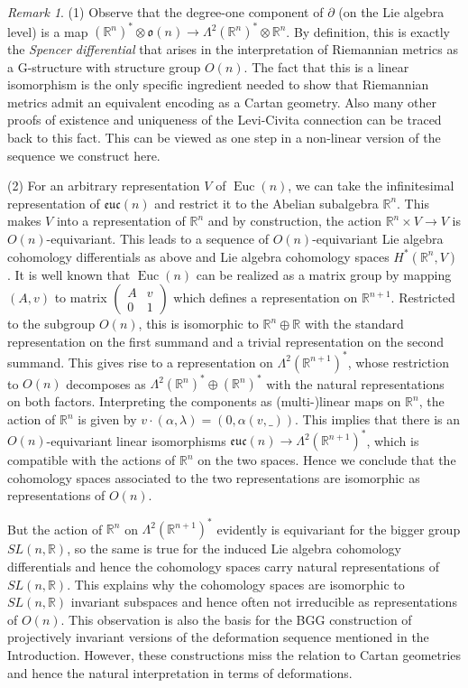 \documentclass[12pt,a4paper]{amsart}
\def\frak{\mathfrak}
\def\Bbb{\mathbb}
\newcommand{\x}{\times}
\newcommand{\al}{\alpha}
\newcommand{\la}{\lambda}
\newcommand{\La}{\Lambda}
\newcommand{\Euc}{\operatorname{Euc}}
\newcommand{\euc}{\mathfrak{euc}}
\newcounter{theorem}
\numberwithin{theorem}{section}
\numberwithin{equation}{section}
\theoremstyle{definition}
\theoremstyle{remark}
\newtheorem{remark}[theorem]{Remark}
\begin{document}
\begin{remark}\label{rem3.5}
(1) Observe that the degree-one component of $\partial$ (on the Lie algebra level) is
  a map $(\Bbb R^n)^*\otimes\frak o(n)\to\La^2(\Bbb R^n)^*\otimes \Bbb R^n$. By
  definition, this is exactly the \textit{Spencer differential} that arises in the
  interpretation of Riemannian metrics as a G-structure with structure group
  $O(n)$. The fact that this is a linear isomorphism is the only specific ingredient
  needed to show that Riemannian metrics admit an equivalent encoding as a Cartan
  geometry. Also many other proofs of existence and uniqueness of the Levi-Civita
  connection can be traced back to this fact. This can be viewed as one step in a
  non-linear version of the sequence we construct here.

  (2) For an arbitrary representation $V$ of $\Euc(n)$, we can take the infinitesimal
  representation of $\euc(n)$ and restrict it to the Abelian subalgebra $\Bbb
  R^n$. This makes $V$ into a representation of $\Bbb R^n$ and by construction, the
  action $\Bbb R^n\x V\to V$ is $O(n)$-equivariant. This leads to a sequence of
  $O(n)$-equivariant Lie algebra cohomology differentials as above and Lie algebra
  cohomology spaces $H^*(\Bbb R^n,V)$. It is well known that $\Euc(n)$ can be
  realized as a matrix group by mapping $(A,v)$ to matrix $\begin{pmatrix} A & v\\ 0
    & 1 \end{pmatrix}$ which defines a representation on $\Bbb R^{n+1}$. Restricted
  to the subgroup $O(n)$, this is isomorphic to $\Bbb R^n\oplus\Bbb R$ with the
  standard representation on the first summand and a trivial representation on the
  second summand. This gives rise to a representation on $\La^2(\Bbb R^{n+1})^*$,
  whose restriction to $O(n)$ decomposes as $\La^2(\Bbb R^n)^*\oplus(\Bbb R^n)^*$
  with the natural representations on both factors. Interpreting the components as
  (multi-)linear maps on $\Bbb R^n$, the action of $\Bbb R^n$ is given by $v\cdot
  (\al,\la)=(0,\al(v,\_))$. This implies that there is an $O(n)$-equivariant linear
  isomorphisms $\euc(n)\to \La^2(\Bbb R^{n+1})^*$, which is compatible with the
  actions of $\Bbb R^n$ on the two spaces. Hence we conclude that the cohomology
  spaces associated to the two representations are isomorphic as representations of
  $O(n)$.

  But the action of $\Bbb R^n$ on $\La^2(\Bbb R^{n+1})^*$ evidently is equivariant
  for the bigger group $SL(n,\Bbb R)$, so the same is true for the induced Lie
  algebra cohomology differentials and hence the cohomology spaces carry natural
  representations of $SL(n,\Bbb R)$. This explains why the cohomology spaces are
  isomorphic to $SL(n,\Bbb R)$ invariant subspaces and hence often not irreducible as
  representations of $O(n)$. This observation is also the basis for the BGG
  construction of projectively invariant versions of the deformation sequence
  mentioned in the Introduction. However, these constructions miss the relation to
  Cartan geometries and hence the natural interpretation in terms of deformations.
\end{remark}
\end{document}
